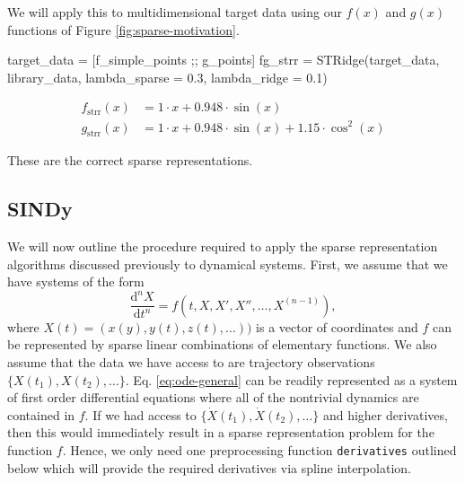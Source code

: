 \documentclass[
]{article}
\newenvironment{Shaded}{\begin{snugshade}}{\end{snugshade}}
\newcommand{\FloatTok}[1]{\textcolor[rgb]{0.68,0.00,0.00}{#1}}
\newcommand{\FunctionTok}[1]{\textcolor[rgb]{0.28,0.35,0.67}{#1}}
\newcommand{\NormalTok}[1]{\textcolor[rgb]{0.00,0.23,0.31}{#1}}
\newcommand{\OperatorTok}[1]{\textcolor[rgb]{0.37,0.37,0.37}{#1}}
\begin{document}
We will apply this to multidimensional target data using our \(f(x)\)
and \(g(x)\) functions of Figure \ref{fig:sparse-motivation}.

\begin{Shaded}
\begin{Highlighting}[]
\NormalTok{target\_data }\OperatorTok{=}\NormalTok{ [f\_simple\_points ;; g\_points]}
\NormalTok{fg\_strr }\OperatorTok{=} \FunctionTok{STRidge}\NormalTok{(target\_data, library\_data, lambda\_sparse }\OperatorTok{=} \FloatTok{0.3}\NormalTok{, lambda\_ridge }\OperatorTok{=} \FloatTok{0.1}\NormalTok{)}
\end{Highlighting}
\end{Shaded}

\begin{subequations} \label{eq:g-strr} \begin{align}    f_{\text{strr}}(x) &= 1 \cdot x + 0.948 \cdot \sin\left( x \right) \\
  g_{\text{strr}}(x) &= 1 \cdot x + 0.948 \cdot \sin\left( x \right) + 1.15 \cdot \cos^{2}\left( x \right) \end{align} \end{subequations}

These are the correct sparse representations.

\subsection{SINDy}\label{sindy}

We will now outline the procedure required to apply the sparse
representation algorithms discussed previously to dynamical systems.
First, we assume that we have systems of the form
\begin{equation} \label{eq:ode-general}
\frac{\text{d}^n X}{\text{d}t^n} = f(t, X,  X', X'', \dots, X^{(n - 1)}),
\end{equation} where \(X(t) = (x(y), y(t), z(t),  \dots))\) is a vector
of coordinates and \(f\) can be represented by sparse linear
combinations of elementary functions. We also assume that the data we
have access to are trajectory observations
\(\{X(t_1), X(t_2), \dots \}\). Eq. \eqref{eq:ode-general} can be
readily represented as a system of first order differential equations
where all of the nontrivial dynamics are contained in \(f\). If we had
access to \(\{\dot{X}(t_1), \dot{X}(t_2), \dots \}\) and higher
derivatives, then this would immediately result in a sparse
representation problem for the function \(f\). Hence, we only need one
preprocessing function \texttt{derivatives} outlined below which will
provide the required derivatives via spline interpolation.
\end{document}
